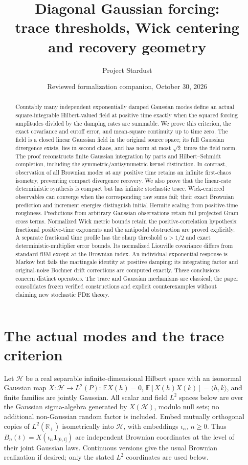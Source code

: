 \documentclass[11pt]{article}
\title{Diagonal Gaussian forcing:\\trace thresholds, Wick centering and recovery geometry}
\author{Project Stardust}
\date{Reviewed formalization companion, October 30, 2026}
\newcommand{\R}{\mathbb R}\newcommand{\E}{\mathbb E}
\newcommand{\Hh}{\mathcal H}\newcommand{\tr}{\operatorname{tr}}
\begin{document}
\maketitle
\begin{abstract}
Countably many independent exponentially damped Gaussian modes define
an actual square-integrable Hilbert-valued field at positive time exactly
when the squared forcing amplitudes divided by the damping rates are
summable. We prove this criterion, the exact covariance and cutoff error,
and mean-square continuity up to time zero. The field is a closed linear
Gaussian field in the original source space; its full Gaussian divergence
exists, lies in second chaos, and has norm at most $\sqrt2$ times the
field norm. The proof reconstructs finite Gaussian integration by parts
and Hilbert--Schmidt completion, including the symmetric/antisymmetric
kernel distinction. In contrast, observation of all Brownian modes at
any positive time retains an infinite first-chaos isometry, preventing
compact divergence recovery. We also prove that the linear-rate deterministic synthesis is compact
but has infinite stochastic trace. Wick-centered observables can converge
when the corresponding raw sums fail; their exact Brownian prediction
and increment energies distinguish initial Hermite scaling from
positive-time roughness. Predictions from arbitrary Gaussian observations retain full projected Gram cross terms. Normalized Wick metric bounds retain the
positive-correlation hypothesis; fractional positive-time exponents and
the antipodal obstruction are proved explicitly. A separate fractional time profile has the sharp threshold $\alpha>1/2$ and exact deterministic-multiplier error bounds. Its normalized Liouville covariance differs from standard fBM except at the Brownian index. An individual exponential response is Markov but fails the martingale identity at positive damping; its integrating factor and original-noise Bochner drift corrections are computed exactly. These conclusions concern distinct operators. The trace and Gaussian mechanisms are
classical; the paper consolidates frozen verified constructions and
explicit counterexamples without claiming new stochastic PDE theory.
\end{abstract}

\section{The actual modes and the trace criterion}
Let $\Hh$ be a real separable infinite-dimensional Hilbert space with
an isonormal Gaussian map $X:\Hh\to L^2(P)$:
$\E X(h)=0$, $\E[X(h)X(k)]=\langle h,k\rangle$, and finite families
are jointly Gaussian. All scalar and field $L^2$ spaces below are over
the Gaussian sigma-algebra generated by $X(\Hh)$, modulo null sets;
no additional non-Gaussian random factor is included. Embed mutually
orthogonal copies of
$L^2(\R_+)$ isometrically into $\Hh$, with embeddings $\iota_n$,
$n\geq0$. Thus $B_n(t)=X(\iota_n\mathbf1_{(0,t]})$ are independent
Brownian coordinates at the level of their joint Gaussian laws.
Continuous versions give the usual Brownian realization if desired;
only the stated $L^2$ coordinates are used below.
\end{document}
